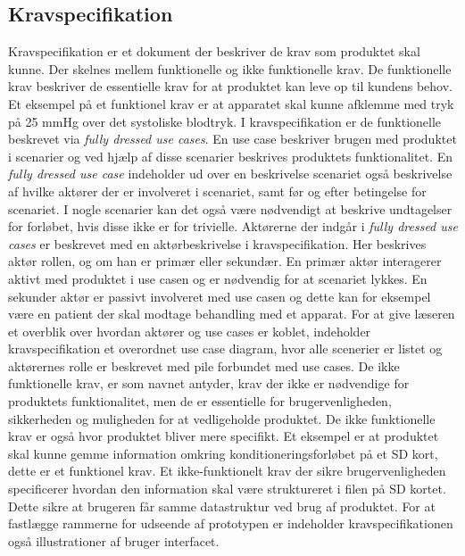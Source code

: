 	\subsection{Kravspecifikation} \label{title:kravspecifikation}
	Kravspecifikation er et dokument der beskriver de krav som produktet skal kunne. Der skelnes mellem funktionelle og ikke funktionelle krav. De funktionelle krav beskriver de essentielle krav for at produktet kan leve op til kundens behov. Et eksempel på et funktionel krav er at apparatet skal kunne afklemme med tryk på 25 mmHg over det systoliske blodtryk. I kravspecifikation er de funktionelle beskrevet via \textit{fully dressed use cases}. En use case beskriver brugen med produktet i scenarier og ved hjælp af disse scenarier beskrives produktets funktionalitet. En \textit{fully dressed use case} indeholder ud over en beskrivelse scenariet også beskrivelse af hvilke aktører der er involveret i scenariet, samt før og efter betingelse for scenariet. I nogle scenarier kan det også være nødvendigt at beskrive undtagelser for forløbet, hvis disse ikke er for trivielle. Aktørerne der indgår i \textit{fully dressed use cases} er beskrevet med en aktørbeskrivelse i kravspecifikation. Her beskrives aktør rollen, og om han er primær eller sekundær. En primær aktør interagerer aktivt med produktet i use casen og er nødvendig for at scenariet lykkes. En sekunder aktør er passivt involveret med use casen og dette kan for eksempel være en patient der skal modtage behandling med et apparat. For at give læseren et overblik over hvordan aktører og use cases er koblet, indeholder kravspecifikation et overordnet use case diagram, hvor alle scenerier er listet og aktørernes rolle er beskrevet med pile forbundet med use cases. 
	De ikke funktionelle krav, er som navnet antyder, krav der ikke er nødvendige for produktets funktionalitet, men de er essentielle for brugervenligheden, sikkerheden og muligheden for at vedligeholde produktet. De ikke funktionelle krav er også hvor produktet bliver mere specifikt. Et eksempel er at produktet skal kunne gemme information omkring konditioneringsforløbet på et SD kort, dette er et funktionel krav. Et ikke-funktionelt krav der sikre brugervenligheden specificerer hvordan den information skal være struktureret i filen på SD kortet. Dette sikre at brugeren får samme datastruktur ved brug af produktet. 
	For at fastlægge rammerne for udseende af prototypen er indeholder kravspecifikationen også illustrationer af bruger interfacet. 
	
